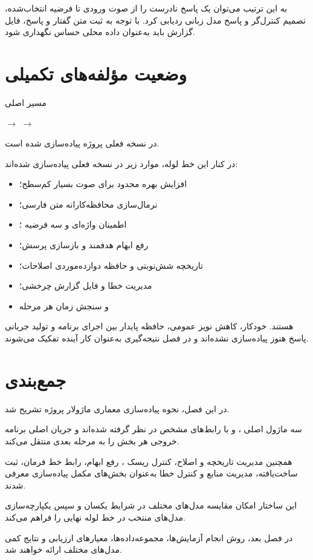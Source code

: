 به این ترتیب می‌توان یک پاسخ نادرست را از صوت ورودی تا فرضیه
انتخاب‌شده، تصمیم کنترل‌گر و پاسخ مدل زبانی ردیابی کرد. با توجه
به ثبت متن گفتار و پاسخ، فایل گزارش باید به‌عنوان داده محلی
حساس نگهداری شود.


\section{وضعیت مؤلفه‌های تکمیلی}

مسیر اصلی

\begin{center}
$\longrightarrow$
$\longrightarrow$
\end{center}

در نسخه فعلی پروژه پیاده‌سازی شده است.

در کنار این خط لوله، موارد زیر در نسخه فعلی پیاده‌سازی شده‌اند:

\begin{itemize}
    \item افزایش بهره محدود برای صوت بسیار کم‌سطح؛
    \item نرمال‌سازی محافظه‌کارانه متن فارسی؛
    \item اطمینان واژه‌ای و سه فرضیه ؛
    \item رفع ابهام هدفمند و بازسازی پرسش؛
    \item تاریخچه شش‌نوبتی و حافظه دوازده‌موردی اصلاحات؛
    \item مدیریت خطا و فایل گزارش چرخشی؛
    \item و سنجش زمان هر مرحله
\end{itemize}

هستند.  خودکار، کاهش نویز عمومی، حافظه پایدار بین اجرای
برنامه و تولید جریانی پاسخ هنوز پیاده‌سازی نشده‌اند و در فصل
نتیجه‌گیری به‌عنوان کار آینده تفکیک می‌شوند.


\section{جمع‌بندی}

در این فصل، نحوه پیاده‌سازی معماری ماژولار پروژه تشریح شد.

سه ماژول اصلی ،  و  با رابط‌های مشخص در نظر گرفته
شده‌اند و جریان اصلی برنامه خروجی هر بخش را به مرحله بعدی
منتقل می‌کند.

همچنین مدیریت تاریخچه و اصلاح، کنترل ریسک ، رفع ابهام،
رابط خط فرمان، ثبت ساخت‌یافته، مدیریت منابع و کنترل خطا به‌عنوان
بخش‌های مکمل پیاده‌سازی معرفی شدند.

این ساختار امکان مقایسه مدل‌های مختلف در شرایط یکسان و سپس
یکپارچه‌سازی مدل‌های منتخب در خط لوله نهایی را فراهم می‌کند.

در فصل بعد، روش انجام آزمایش‌ها، مجموعه‌داده‌ها، معیارهای
ارزیابی و نتایج کمی مدل‌های مختلف ارائه خواهند شد.
